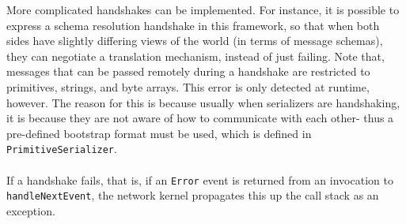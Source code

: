 \documentclass{article}
\begin{document}
More complicated handshakes can be implemented. For instance, it is possible to
express a schema resolution handshake in this framework, so that when both sides
have slightly differing views of the world (in terms of message schemas), they 
can negotiate a translation mechanism, instead of just failing. Note that,
messages that can be passed remotely during a handshake are restricted to primitives,
strings, and byte arrays. This error is only detected at runtime, however. The
reason for this is because usually when serializers are handshaking, it is because
they are not aware of how to communicate with each other- thus a pre-defined bootstrap
format must be used, which is defined in \verb|PrimitiveSerializer|. \\ \\
If a handshake fails, that is, if an \verb|Error| event is returned from
an invocation to \verb|handleNextEvent|, the network kernel propagates this up the
call stack as an exception.
\end{document}
